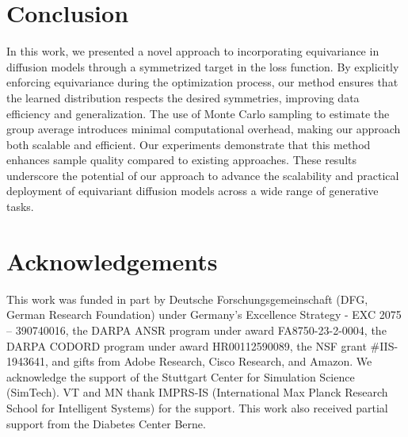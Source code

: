 \section{Conclusion}
\label{sec:conclusion}

In this work, we presented a novel approach to incorporating equivariance in diffusion models through a symmetrized target in the loss function. By explicitly enforcing equivariance during the optimization process, our method ensures that the learned distribution respects the desired symmetries, improving data efficiency and generalization. The use of Monte Carlo sampling to estimate the group average introduces minimal computational overhead, making our approach both scalable and efficient. Our experiments demonstrate that this method enhances sample quality compared to existing approaches. These results underscore the potential of our approach to advance the scalability and practical deployment of equivariant diffusion models across a wide range of generative tasks.

\section*{Acknowledgements}
This work was funded in part by Deutsche Forschungsgemeinschaft (DFG, German Research Foundation) under Germany's Excellence Strategy - EXC 2075 – 390740016, the DARPA ANSR program under award FA8750-23-2-0004, the DARPA CODORD program under award HR00112590089, the NSF grant \#IIS-1943641, and gifts from Adobe Research, Cisco Research, and Amazon.
We acknowledge the support of the Stuttgart Center for Simulation Science (SimTech). VT and MN thank IMPRS-IS (International Max Planck Research School for Intelligent Systems) for the support. This work also received partial support from the Diabetes Center Berne.


